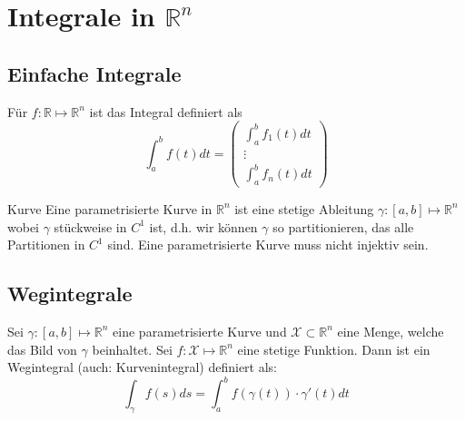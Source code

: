 \documentclass[a4paper,10pt]{article}
\def\R{\mathbb{R}}
\def\X{\mathcal{X}}
\begin{document}
\section{Integrale in \texorpdfstring{\(\R^n\)}{Rⁿ}}
\subsection{Einfache Integrale}
Für \(f: \R \mapsto \R^n\) ist das Integral definiert als
\[\int_a^b f(t)dt = 
\begin{pmatrix*}
  \int_a^b f_1(t) dt \\
  \vdots\\
  \int_a^b f_n(t) dt
\end{pmatrix*}
\]

\begin{mainbox}{Kurve}
  Eine parametrisierte Kurve in \(\R^n\) ist eine stetige Ableitung \(\gamma: \left[a,b\right] \mapsto \R^n\) wobei \(\gamma\) stückweise in \(C^1\) ist, d.h. wir können \(\gamma\) so partitionieren, das alle Partitionen in \(C^1\) sind. Eine parametrisierte Kurve muss nicht injektiv sein.
\end{mainbox}
\subsection{Wegintegrale}
Sei \(\gamma : \left[a,b\right] \mapsto \R^n\) eine parametrisierte Kurve und \(\X \subset \R^n\) eine Menge, welche das Bild von \(\gamma\) beinhaltet. Sei \(f : \X \mapsto \R^n\) eine stetige Funktion. Dann ist ein Wegintegral (auch: Kurvenintegral) definiert als:
\[\int_\gamma f(s) ds = \int_a^b f(\gamma(t)) \cdot \gamma'(t) dt\]
\end{document}
